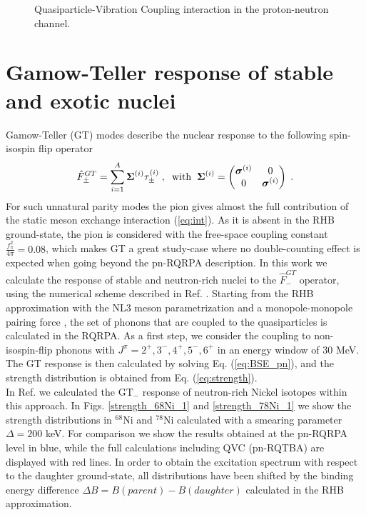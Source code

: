 \documentclass{PoS}
\begin{document}
\begin{figure*}
\centering
{}
\caption{Quasiparticle-Vibration Coupling interaction in the proton-neutron channel.}
\label{fig:Phi_IS}
\end{figure*}


\section{Gamow-Teller response of stable and exotic nuclei}
Gamow-Teller (GT) modes describe the nuclear response to the following spin-isospin flip operator
\begin{equation}
\hat F^{GT}_{\pm} = \sum_{i=1}^A \boldsymbol{\Sigma}^{(i)} \tau_\pm^{(i)} \;, \hspace{0.2cm}  \mbox{with} \hspace{0.2cm}  
\boldsymbol{\Sigma}^{(i)} = 
\begin{pmatrix}
\boldsymbol{\sigma}^{(i)} & 0 \\
0 & \boldsymbol{\sigma}^{(i)} 
\end{pmatrix} \; .
\end{equation}
%
For such unnatural parity modes the pion gives almost the full contribution of the static meson exchange interaction (\ref{eq:int}). As it is absent in the RHB ground-state, the pion is considered with the free-space coupling constant $\frac{f_\pi^2}{4\pi} =  0.08$, which makes GT a great study-case where no double-counting effect is expected when going beyond the pn-RQRPA description.
In this work we calculate the response of stable and neutron-rich nuclei to the $\hat F^{GT}_-$ operator, using the numerical scheme described in Ref. \cite{Robin}.
Starting from the RHB approximation with the NL3 meson parametrization \cite{NL3} and a monopole-monopole pairing force \cite{Litvinova2008}, the set
of phonons that are coupled to the quasiparticles is calculated in the RQRPA.  
As a first step, we consider the coupling to non-isospin-flip phonons with $J^\pi=2^+,3^-,4^+,5^-,6^+$ in an energy window of $30$ MeV. The GT response is then calculated by solving Eq. (\ref{eq:BSE_pn}), and the strength distribution is obtained from Eq. (\ref{eq:strength}).
\\
In Ref. \cite{Robin} we calculated the GT$_-$ response of neutron-rich Nickel isotopes within this approach. In Figs. \ref{strength_68Ni_1} and \ref{strength_78Ni_1} we show the strength distributions in $^{68}$Ni and $^{78}$Ni calculated with a smearing parameter $\Delta = 200$ keV. For comparison we show the results obtained at the pn-RQRPA level in blue, while the full calculations including QVC (pn-RQTBA) are displayed with red lines. In order to obtain the excitation spectrum with respect to the daughter ground-state, all distributions have been shifted by the binding energy difference $\Delta B = B(parent) - B(daughter)$ calculated in the RHB approximation.
\end{document}
